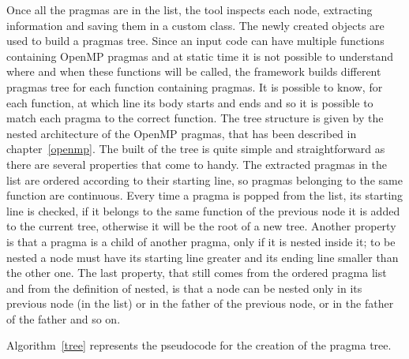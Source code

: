 \documentclass[a4paper,11pt,oneside]{book}
\begin{document}
Once all the pragmas are in the list, the tool inspects each node, extracting information and saving them in a custom class. The newly created objects are used to build a pragmas tree. Since an input code can have multiple functions containing OpenMP pragmas and at static time it is not possible to understand where and when these functions will be called, the framework builds different pragmas tree for each function containing pragmas. It is possible to know, for each function, at which line its body starts and ends and so it is possible to match each pragma to the correct function. The tree structure is given by the nested architecture of the OpenMP pragmas, that has been described in chapter~\ref{openmp}. The built of the tree is quite simple and straightforward as there are several properties that come to handy. The extracted pragmas in the list are ordered according to their starting line, so pragmas belonging to the same function are continuous. Every time a pragma is popped from the list, its starting line is checked, if it belongs to the same function of the previous node it is added to the current tree, otherwise it will be the root of a new tree. Another property is that a pragma is a child of another pragma, only if it is nested inside it; to be nested a node must have its starting line greater and its ending line smaller than the other one.  The last property, that still comes from the ordered pragma list and from the definition of nested, is that a node can be nested only in its previous node (in the list) or in the father of the previous node, or in the father of the father and so on.


Algorithm~\ref{tree} represents the pseudocode for the creation of the pragma tree.
\end{document}
